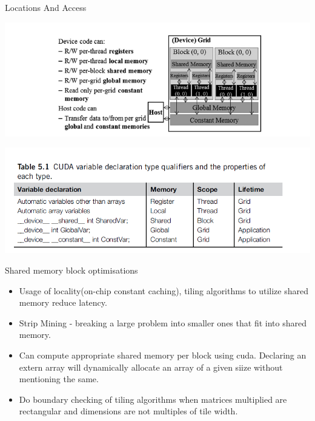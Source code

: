 \documentclass{beamer}
\begin{document}
\begin{frame}{Locations And Access}
    \begin{center}
    \includegraphics[scale = 0.4]{Location}
    \end{center}
    \begin{center}
    \includegraphics[scale = 0.4]{Occupancy}
    \end{center}

\end{frame}
\begin{frame}{Shared memory block optimisations}
    \begin{itemize}
        \item Usage of locality(on-chip constant caching), tiling algorithms to utilize shared memory reduce latency.
        \item Strip Mining - breaking a large problem into smaller ones that fit into shared memory.
        \item Can compute appropriate shared memory per block using cuda. Declaring an extern array will dynamically allocate an array of a given siize without mentioning the same. 
        \item Do boundary checking of tiling algorithms when matrices multiplied are rectangular and dimensions are not multiples of tile width.
    \end{itemize}
\end{frame}
\end{document}
